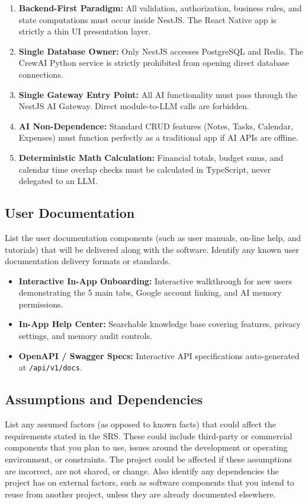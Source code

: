 \documentclass[11pt,a4paper]{article}
\begin{document}
\begin{enumerate}
    \item \textbf{Backend-First Paradigm:} All validation, authorization, business rules, and state computations must occur inside NestJS. The React Native app is strictly a thin UI presentation layer.
    \item \textbf{Single Database Owner:} Only NestJS accesses PostgreSQL and Redis. The CrewAI Python service is strictly prohibited from opening direct database connections.
    \item \textbf{Single Gateway Entry Point:} All AI functionality must pass through the NestJS AI Gateway. Direct module-to-LLM calls are forbidden.
    \item \textbf{AI Non-Dependence:} Standard CRUD features (Notes, Tasks, Calendar, Expenses) must function perfectly as a traditional app if AI APIs are offline.
    \item \textbf{Deterministic Math Calculation:} Financial totals, budget sums, and calendar time overlap checks must be calculated in TypeScript, never delegated to an LLM.
\end{enumerate}

\subsection{User Documentation}
List the user documentation components (such as user manuals, on-line help, and tutorials) that will be delivered along with the software. Identify any known user documentation delivery formats or standards.

\begin{itemize}
    \item \textbf{Interactive In-App Onboarding:} Interactive walkthrough for new users demonstrating the 5 main tabs, Google account linking, and AI memory permissions.
    \item \textbf{In-App Help Center:} Searchable knowledge base covering features, privacy settings, and memory audit controls.
    \item \textbf{OpenAPI / Swagger Specs:} Interactive API specifications auto-generated at \texttt{/api/v1/docs}.
\end{itemize}

\subsection{Assumptions and Dependencies}
List any assumed factors (as opposed to known facts) that could affect the requirements stated in the SRS. These could include third-party or commercial components that you plan to use, issues around the development or operating environment, or constraints. The project could be affected if these assumptions are incorrect, are not shared, or change. Also identify any dependencies the project has on external factors, such as software components that you intend to reuse from another project, unless they are already documented elsewhere.
\end{document}
